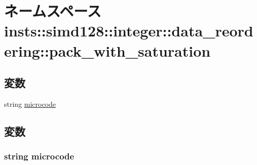\hypertarget{namespaceinsts_1_1simd128_1_1integer_1_1data__reordering_1_1pack__with__saturation}{
\section{ネームスペース insts::simd128::integer::data\_\-reordering::pack\_\-with\_\-saturation}
\label{namespaceinsts_1_1simd128_1_1integer_1_1data__reordering_1_1pack__with__saturation}
}
\subsection*{変数}
\begin{DoxyCompactItemize}
\item 
string \hyperlink{namespaceinsts_1_1simd128_1_1integer_1_1data__reordering_1_1pack__with__saturation_a770f11a173e99389a8802f0107ed8f52}{microcode}
\end{DoxyCompactItemize}


\subsection{変数}
\hypertarget{namespaceinsts_1_1simd128_1_1integer_1_1data__reordering_1_1pack__with__saturation_a770f11a173e99389a8802f0107ed8f52}{
\subsubsection[{microcode}]{\setlength{\rightskip}{0pt plus 5cm}string {\bf microcode}}}
\label{namespaceinsts_1_1simd128_1_1integer_1_1data__reordering_1_1pack__with__saturation_a770f11a173e99389a8802f0107ed8f52}
